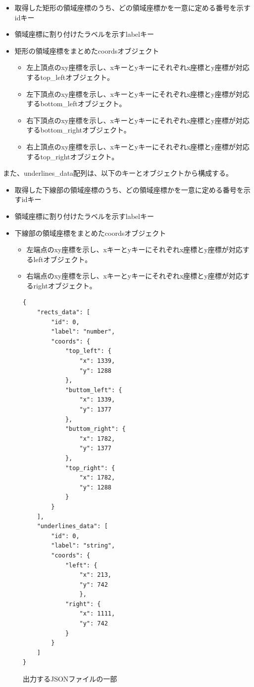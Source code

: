 \begin{itemize}
    \item 取得した矩形の領域座標のうち、どの領域座標かを一意に定める番号を示すidキー
    \item 領域座標に割り付けたラベルを示すlabelキー
    \item 矩形の領域座標をまとめたcoordsオブジェクト
    \begin{itemize}
        \item 左上頂点のxy座標を示し、xキーとyキーにそれぞれx座標とy座標が対応するtop\_leftオブジェクト。
        \item 左下頂点のxy座標を示し、xキーとyキーにそれぞれx座標とy座標が対応するbottom\_leftオブジェクト。
        \item 右下頂点のxy座標を示し、xキーとyキーにそれぞれx座標とy座標が対応するbottom\_rightオブジェクト。
        \item 右上頂点のxy座標を示し、xキーとyキーにそれぞれx座標とy座標が対応するtop\_rightオブジェクト。
    \end{itemize}
\end{itemize}

また、underlines\_data配列は、以下のキーとオブジェクトから構成する。
\begin{itemize}
    \item 取得した下線部の領域座標のうち、どの領域座標かを一意に定める番号を示すidキー
    \item 領域座標に割り付けたラベルを示すlabelキー
    \item 下線部の領域座標をまとめたcoordsオブジェクト
    \begin{itemize}
        \item 左端点のxy座標を示し、xキーとyキーにそれぞれx座標とy座標が対応するleftオブジェクト。
        \item 右端点のxy座標を示し、xキーとyキーにそれぞれx座標とy座標が対応するrightオブジェクト。
    \end{itemize}
\end{itemize}

\lstset{language=}
\begin{figure}[t]
    \begin{lstlisting}
{
    "rects_data": [
        "id": 0, 
        "label": "number",
        "coords": {
            "top_left": {
                "x": 1339,
                "y": 1288
            },
            "buttom_left": {
                "x": 1339,
                "y": 1377
            },
            "buttom_right": {
                "x": 1782,
                "y": 1377
            },
            "top_right": {
                "x": 1782,
                "y": 1288
            }
        }
    ],
    "underlines_data": [
        "id": 0,
        "label": "string",
        "coords": {
            "left": {
                "x": 213,
                "y": 742
                },
            "right": {
                "x": 1111,
                "y": 742
            }
        }
    ]
}
    \end{lstlisting}
    \caption{出力するJSONファイルの一部}\label{fig:example_output_json}
\end{figure}

